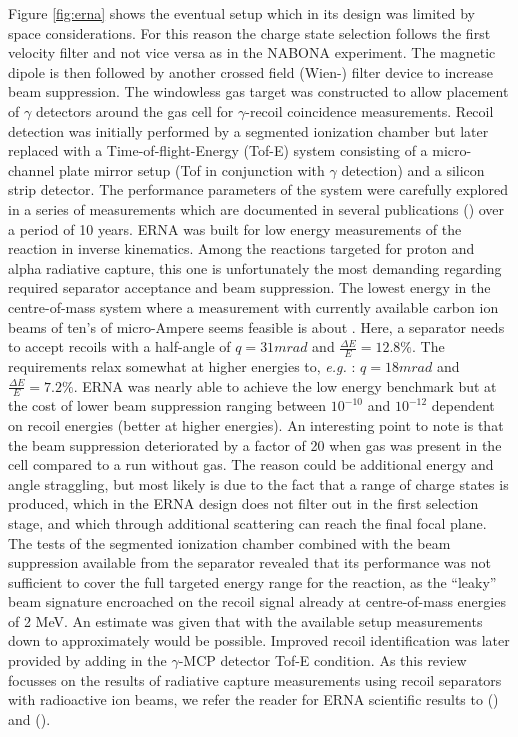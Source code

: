 Figure \ref{fig:erna} shows the eventual setup which in its design was limited by space considerations. For this reason the charge state selection follows the first velocity filter and not vice versa as in the NABONA experiment. The magnetic dipole is then followed by another crossed field (Wien-) filter device to increase beam suppression. The windowless gas target was constructed to allow placement of $\gamma$ detectors around the gas cell for $\gamma$-recoil coincidence measurements. Recoil detection was initially performed by a segmented ionization chamber but later replaced with a Time-of-flight-Energy (Tof-E) system consisting of a micro-channel plate mirror setup (Tof in conjunction with $\gamma$ detection) and a silicon strip detector. The performance parameters of the system were carefully explored in a series of measurements which are documented in several publications (\cite{roga99,roga03,gial04,schu04,dile08}) over a period of 10 years. ERNA was built for low energy measurements of the \reac{\alpha}{\gamma} reaction in inverse kinematics. Among the reactions targeted for proton and alpha radiative capture, this one is unfortunately the most demanding regarding required separator acceptance and beam suppression. The lowest energy in the centre-of-mass system where a measurement with currently available carbon ion beams of ten's of micro-Ampere seems feasible is about . Here, a separator needs to accept recoils with a half-angle of $q = 31 \unit{mrad}$ and $\frac{\Delta{}E}{E} = 12.8\%$. The requirements relax somewhat at higher energies to, {\it e.g.} : $q = 18 \unit{mrad}$ and $\frac{\Delta{}E}{E} = 7.2\%$. ERNA was nearly able to achieve the low energy benchmark but at the cost of lower beam suppression ranging between $10^{-10}$ and $10^{-12}$ dependent on recoil energies (better at higher energies). An interesting point to note is that the beam suppression deteriorated by a factor of 20 when gas was present in the cell compared to a run without gas. The reason could be additional energy and angle straggling, but most likely is due to the fact that a range of charge states is produced, which in the ERNA design does not filter out in the first selection stage, and which through additional scattering can reach the final focal plane. The tests of the segmented ionization chamber combined with the beam suppression available from the separator revealed that its performance was not sufficient to cover the full targeted energy range for the \reac{\alpha}{\gamma} reaction, as the ``leaky'' beam signature encroached on the  recoil signal already at centre-of-mass energies of 2 MeV. An estimate was given that with the available setup measurements down to approximately  would be possible. Improved recoil identification was later provided by adding in the $\gamma$-MCP detector Tof-E condition. As this review focusses on the results of radiative capture measurements using recoil separators with radioactive ion beams, we refer the reader for ERNA scientific results to \cite{schu05} (\reac{\alpha}{\gamma}) and \cite{dile09} (\reac{\alpha}{\gamma}).
